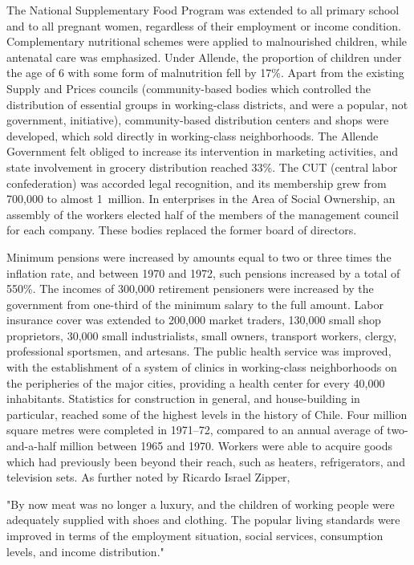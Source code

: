 The National Supplementary Food Program was extended to all primary
school and to all pregnant women, regardless of their employment or
income condition. Complementary nutritional schemes were applied to
malnourished children, while antenatal care was emphasized. Under
Allende, the proportion of children under the age of 6 with some form of
malnutrition fell by 17\%. Apart from the existing Supply and Prices
councils (community-based bodies which controlled the distribution of
essential groups in working-class districts, and were a popular, not
government, initiative), community-based distribution centers and shops
were developed, which sold directly in working-class neighborhoods. The
Allende Government felt obliged to increase its intervention in
marketing activities, and state involvement in grocery distribution
reached 33\%. The CUT (central labor confederation) was accorded legal
recognition, and its membership grew from 700,000 to almost 1~million.
In enterprises in the Area of Social Ownership, an assembly of the
workers elected half of the members of the management council for each
company. These bodies replaced the former board of directors.

Minimum pensions were increased by amounts equal to two or three times
the inflation rate, and between 1970 and 1972, such pensions increased
by a total of 550\%. The incomes of 300,000 retirement pensioners were
increased by the government from one-third of the minimum salary to the
full amount. Labor insurance cover was extended to 200,000 market
traders, 130,000 small shop proprietors, 30,000 small industrialists,
small owners, transport workers, clergy, professional sportsmen, and
artesans. The public health service was improved, with the establishment
of a system of clinics in working-class neighborhoods on the peripheries
of the major cities, providing a health center for every 40,000
inhabitants. Statistics for construction in general, and house-building
in particular, reached some of the highest levels in the history of
Chile. Four million square metres were completed in 1971--72, compared
to an annual average of two-and-a-half million between 1965 and 1970.
Workers were able to acquire goods which had previously been beyond
their reach, such as heaters, refrigerators, and television sets. As
further noted by Ricardo Israel Zipper,

"By now meat was no longer a luxury, and the children of working people
were adequately supplied with shoes and clothing. The popular living
standards were improved in terms of the employment situation, social
services, consumption levels, and income distribution."

